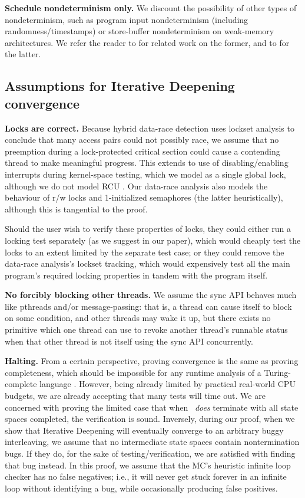 {\bf Schedule nondeterminism only.}
We discount the possibility of other types of nondeterminism,
such as program input nondeterminism (including randomness/timestamps) or
store-buffer nondeterminism on weak-memory architectures.
We refer the reader to \cite{klee,portend} for related work on the former, and to \cite{tsopso} for the latter.

\subsection{Assumptions for Iterative Deepening convergence}

{\bf Locks are correct.}
Because hybrid data-race detection uses lockset analysis to conclude that many access pairs could not possibly race,
we assume that no preemption during a lock-protected critical section could cause a contending thread to make meaningful progress.
This extends to use of disabling/enabling interrupts during kernel-space testing, which we model as a single global lock,
although we do not model RCU \cite{rcu}.
Our data-race analysis also models the behaviour of r/w locks and 1-initialized semaphores (the latter heuristically), although this is tangential to the proof.

Should the user wish to verify these properties of locks,
they could either run a locking test separately (as we suggest in our paper),
which would cheaply test the locks to an extent limited by the separate test case;
or they could remove the data-race analysis's lockset tracking,
which would expensively test all the main program's required locking properties in tandem with the program itself.

{\bf No forcibly blocking other threads.}
We assume the sync API behaves much like pthreads and/or message-passing:
that is, a thread can cause itself to block on some condition,
and other threads may wake it up,
but there exists no primitive which one thread can use to revoke another thread's runnable status when that other thread is not itself using the sync API concurrently.

{\bf Halting.}
From a certain perspective, proving convergence is the same as proving completeness,
which should be impossible for any runtime analysis of a Turing-complete language \cite{entscheidungsproblem}.
However, being already limited by practical real-world CPU budgets,
we are already accepting that many tests will time out.
We are concerned with proving the limited case that when \quicksand~{\em does} terminate with all state spaces completed, the verification is sound.
Inversely, during our proof, when we show that Iterative Deepening will eventually converge to an arbitrary buggy interleaving, we assume that no intermediate state spaces contain nontermination bugs.
If they do, for the sake of testing/verification, we are satisfied with finding that bug instead.
In this proof, we assume that the MC's heuristic infinite loop checker has no false negatives;
i.e., it will never get stuck forever in an infinite loop without identifying a bug, while occasionally producing false positives.

